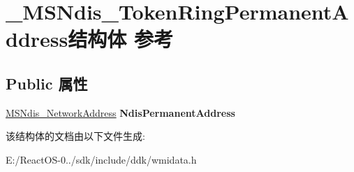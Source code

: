 \hypertarget{struct___m_s_ndis___token_ring_permanent_address}{}\section{\+\_\+\+M\+S\+Ndis\+\_\+\+Token\+Ring\+Permanent\+Address结构体 参考}
\label{struct___m_s_ndis___token_ring_permanent_address}
\subsection*{Public 属性}
\begin{DoxyCompactItemize}
\item 
\mbox{\label{struct___m_s_ndis___token_ring_permanent_address_adf0074d9354b374418ba74149315e390}} 
\hyperlink{struct___m_s_ndis___network_address}{M\+S\+Ndis\+\_\+\+Network\+Address} {\bfseries Ndis\+Permanent\+Address}
\end{DoxyCompactItemize}


该结构体的文档由以下文件生成\+:\begin{DoxyCompactItemize}
\item 
E\+:/\+React\+O\+S-\/0../sdk/include/ddk/wmidata.\+h\end{DoxyCompactItemize}

